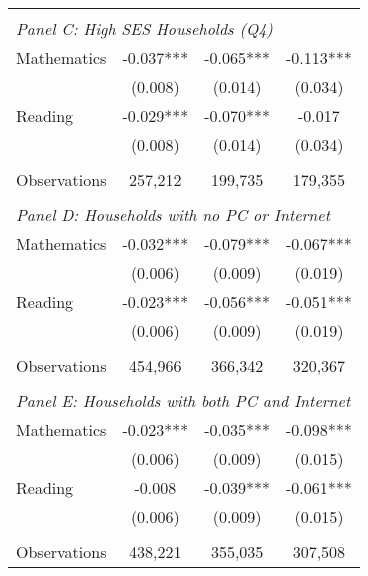 {\begin{tabular}{lccc}
&  &  &   \\
\multicolumn{4}{l}{\textit{Panel C: High SES Households (Q4)}} \\
\hspace{3mm}Mathematics&      -0.037***&      -0.065***&      -0.113***\\
                    &     (0.008)   &     (0.014)   &     (0.034)   \\
 
\hspace{3mm}Reading &      -0.029***&      -0.070***&      -0.017   \\
                    &     (0.008)   &     (0.014)   &     (0.034)   \\
                    &               &               &               \\
\hspace{3mm}Observations&     257,212   &     199,735   &     179,355   \\
 
&  &  &   \\
\multicolumn{4}{l}{\textit{Panel D: Households with no PC or Internet}} \\
\hspace{3mm}Mathematics&      -0.032***&      -0.079***&      -0.067***\\
                    &     (0.006)   &     (0.009)   &     (0.019)   \\
 
\hspace{3mm}Reading &      -0.023***&      -0.056***&      -0.051***\\
                    &     (0.006)   &     (0.009)   &     (0.019)   \\
                    &               &               &               \\
\hspace{3mm}Observations&     454,966   &     366,342   &     320,367   \\
 
&  &  &   \\
\multicolumn{4}{l}{\textit{Panel E: Households with both PC and Internet}} \\
\hspace{3mm}Mathematics&      -0.023***&      -0.035***&      -0.098***\\
                    &     (0.006)   &     (0.009)   &     (0.015)   \\
 
\hspace{3mm}Reading &      -0.008   &      -0.039***&      -0.061***\\
                    &     (0.006)   &     (0.009)   &     (0.015)   \\
                    &               &               &               \\
\hspace{3mm}Observations&     438,221   &     355,035   &     307,508   \\
 

\bottomrule
\end{tabular}
}
